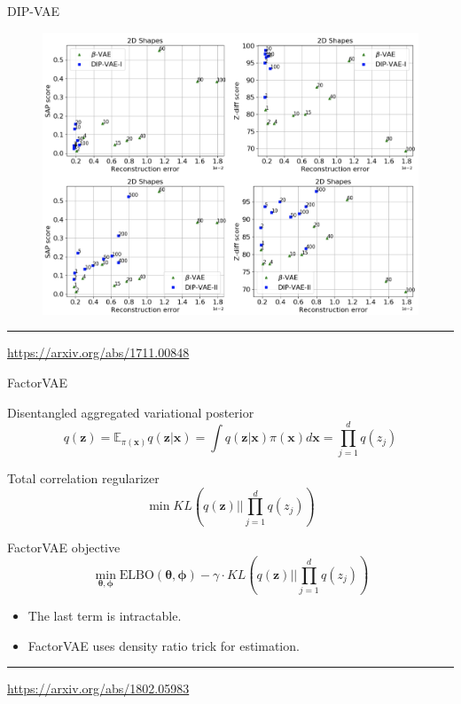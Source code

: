 \documentclass{beamer}
\newcommand{\bx}{\mathbf{x}}
\newcommand{\bz}{\mathbf{z}}
\newcommand{\bbE}{\mathbb{E}}
\newcommand{\btheta}{\boldsymbol{\theta}}
\newcommand{\bphi}{\boldsymbol{\phi}}
\begin{document}
\begin{frame}{DIP-VAE}
	\begin{figure}
		\centering
		\includegraphics[width=0.95\linewidth]{figs/dip-vae_2}
	\end{figure}
	\vfill
	\hrule\medskip
	{\scriptsize \href{https://arxiv.org/abs/1711.00848}{https://arxiv.org/abs/1711.00848}}
\end{frame}
\begin{frame}{FactorVAE}
	\begin{block}{Disentangled aggregated variational posterior}
		\vspace{-0.3cm}
		\[
		q(\bz) = \bbE_{\pi(\bx)} q(\bz | \bx) = \int q(\bz | \bx) \pi(\bx) d\bx = \prod_{j=1}^d q(z_j)
		\]
		\vspace{-0.3cm}
	\end{block}
	\begin{block}{Total correlation regularizer}
		\vspace{-0.3cm}
		\[
		\min KL(q(\bz) || \prod_{j=1}^d q(z_j))
		\]
		\vspace{-0.3cm}
	\end{block}
	\begin{block}{FactorVAE objective}
		\vspace{-0.3cm}
		\[
		\min_{\btheta, \bphi} \text{ELBO}(\btheta, \bphi) - \gamma \cdot KL(q(\bz) || \prod_{j=1}^d q(z_j))
		\]
		\vspace{-0.3cm}
	\end{block}
	\begin{itemize}
		\item The last term is intractable.
		\item FactorVAE uses density ratio trick for estimation. 
	\end{itemize}
	\vspace{0.3cm}

	\vfill
	\hrule\medskip
	{\scriptsize \href{https://arxiv.org/abs/1802.05983}{https://arxiv.org/abs/1802.05983}}
\end{frame}
\end{document}
